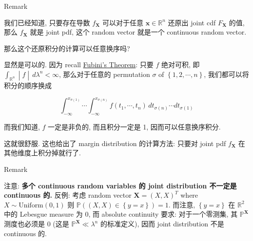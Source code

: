 \documentclass{qlnotes-export}
\begin{document}
\begin{qlremark}{Remark}

我们已经知道, 只要存在导数 \(f_{\mathbf{X}}\) 可以对于任意 \(\mathbf{x} \in {\mathbb{R}}^{n}\) 还原出 joint cdf \(F_{\mathbf{X}}\) 的值, 那么 \(f_{\mathbf{X}}\) 就是 joint pdf, 这个 random vector 就是一个 continuous random vector.

那么这个还原积分的计算可以任意换序吗?

显然是可以的. 因为 recall \href{https://qiulinfan.github.io/notes/math/measure-theory/\#kn-fubini-theorem}{Fubini's Theorem}: 只要 \(f\) 绝对可积, 即 \(\left. \int_{{\mathbb{R}}^{n}} \middle| f \middle| \, d\lambda^{n} < \infty \right.\), 那么对于任意的 permutation \(\sigma\) of \(\left\{ {1,2,\cdots,n} \right\}\), 我们都可以将积分的顺序换成

\[\int_{- \infty}^{x_{\sigma(1)}}\cdots\int_{- \infty}^{x_{\sigma(n)}}f(t_{1},\cdots,t_{n})\, dt_{\sigma(n)}\cdots dt_{\sigma(1)}\]

而我们知道, \(f\) 一定是非负的, 而且积分一定是 1, 因而可以任意换序积分.

这就很舒服. 这也给出了 margin distribution 的计算方法: 只要对 joint pdf \(f_{\mathbf{X}}\) 在其他维度上积分掉就行了.

\end{qlremark}

\begin{qlremark}{Remark}

注意: \textbf{多个 continuous random variables 的 joint distribution 不一定是 continuous 的.} 反例: 考虑 random vector \(\mathbf{X} = (X,X)^{T}\) where \(X \sim \text{Uniform}(0,1)\) 则 \({\mathbb{P}}((X,X) \in \left\{ {y = x} \right\}) = 1\). 而注意, \(\left\{ {y = x} \right\}\) 在 \({\mathbb{R}}^{2}\) 中的 Lebesgue measure 为 0, 而 absolute continuity 要求: 对于一个零测集, 其 \({\mathbb{P}}^{\mathbf{X}}\) 测度也必须是 0 (这是 \({\mathbb{P}}^{\mathbf{X}} \ll \lambda^{n}\) 的标准定义), 因而 joint distribution 不是 continuous 的.

\end{qlremark}
\end{document}
